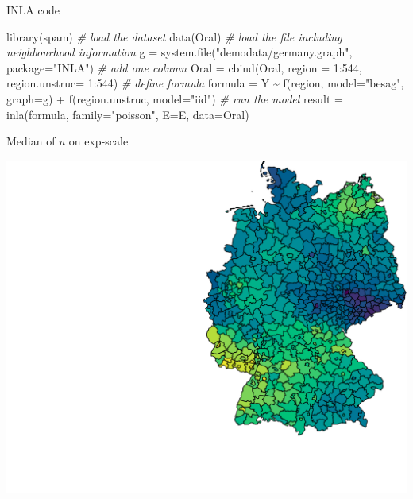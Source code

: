 \documentclass[
  ignorenonframetext,
]{beamer}
\newenvironment{Shaded}{\begin{snugshade}}{\end{snugshade}}
\newcommand{\AttributeTok}[1]{\textcolor[rgb]{0.77,0.63,0.00}{#1}}
\newcommand{\CommentTok}[1]{\textcolor[rgb]{0.56,0.35,0.01}{\textit{#1}}}
\newcommand{\DecValTok}[1]{\textcolor[rgb]{0.00,0.00,0.81}{#1}}
\newcommand{\FunctionTok}[1]{\textcolor[rgb]{0.00,0.00,0.00}{#1}}
\newcommand{\NormalTok}[1]{#1}
\newcommand{\OtherTok}[1]{\textcolor[rgb]{0.56,0.35,0.01}{#1}}
\newcommand{\SpecialCharTok}[1]{\textcolor[rgb]{0.00,0.00,0.00}{#1}}
\newcommand{\StringTok}[1]{\textcolor[rgb]{0.31,0.60,0.02}{#1}}
\begin{document}
\begin{frame}[fragile]{INLA code}
\protect\hypertarget{inla-code}{}
\begin{Shaded}
\begin{Highlighting}[]
\FunctionTok{library}\NormalTok{(spam)}
\CommentTok{\# load the dataset}
\FunctionTok{data}\NormalTok{(Oral)}
\CommentTok{\# load the file including neighbourhood information}
\NormalTok{g }\OtherTok{=} \FunctionTok{system.file}\NormalTok{(}\StringTok{"demodata/germany.graph"}\NormalTok{, }\AttributeTok{package=}\StringTok{"INLA"}\NormalTok{)}
\CommentTok{\# add one column }
\NormalTok{Oral }\OtherTok{=} \FunctionTok{cbind}\NormalTok{(Oral, }\AttributeTok{region =} \DecValTok{1}\SpecialCharTok{:}\DecValTok{544}\NormalTok{, }\AttributeTok{region.unstruc=} \DecValTok{1}\SpecialCharTok{:}\DecValTok{544}\NormalTok{)}
\CommentTok{\# define formula}
\NormalTok{formula }\OtherTok{=}\NormalTok{ Y }\SpecialCharTok{\textasciitilde{}} \FunctionTok{f}\NormalTok{(region, }\AttributeTok{model=}\StringTok{"besag"}\NormalTok{, }\AttributeTok{graph=}\NormalTok{g) }\SpecialCharTok{+}
                           \FunctionTok{f}\NormalTok{(region.unstruc, }\AttributeTok{model=}\StringTok{"iid"}\NormalTok{)}
\CommentTok{\# run the model}
\NormalTok{result }\OtherTok{=} \FunctionTok{inla}\NormalTok{(formula, }\AttributeTok{family=}\StringTok{"poisson"}\NormalTok{, }\AttributeTok{E=}\NormalTok{E, }\AttributeTok{data=}\NormalTok{Oral)}
\end{Highlighting}
\end{Shaded}
\end{frame}

\begin{frame}{Median of \(u\) on exp-scale}
\protect\hypertarget{median-of-u-on-exp-scale}{}
\small

\begin{center}\includegraphics[width=0.6\linewidth]{Part2_RINLA_files/figure-beamer/unnamed-chunk-47-1} \end{center}
\end{frame}
\end{document}
